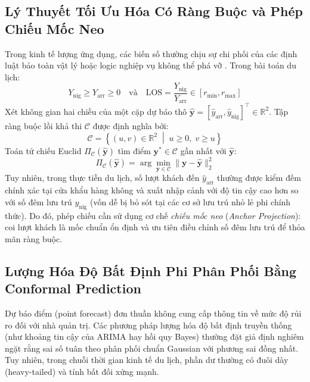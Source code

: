 \subsection{Lý Thuyết Tối Ưu Hóa Có Ràng Buộc và Phép Chiếu Mốc Neo}
Trong kinh tế lượng ứng dụng, các biến số thường chịu sự chi phối của các định luật bảo toàn vật lý hoặc logic nghiệp vụ không thể phá vỡ \cite{cortes2024inconsistency}. Trong bài toán du lịch:
\begin{equation}
    Y_{\text{nig}} \ge Y_{\text{arr}} \ge 0 \quad \text{và} \quad \text{LOS} = \frac{Y_{\text{nig}}}{Y_{\text{arr}}} \in [r_{\min}, r_{\max}]
\end{equation}
Xét không gian hai chiều của một cặp dự báo thô $\hat{\mathbf{y}} = [\hat{y}_{\text{arr}}, \hat{y}_{\text{nig}}]^\top \in \mathbb{R}^2$. Tập ràng buộc lồi khả thi $\mathcal{C}$ được định nghĩa bởi:
\begin{equation}
    \mathcal{C} = \left\{ (u, v) \in \mathbb{R}^2 \;\middle|\; u \ge 0, \; v \ge u \right\}
\end{equation}
Toán tử chiếu Euclid $\Pi_{\mathcal{C}}(\hat{\mathbf{y}})$ tìm điểm $\mathbf{y}^* \in \mathcal{C}$ gần nhất với $\hat{\mathbf{y}}$:
\begin{equation}
    \Pi_{\mathcal{C}}(\hat{\mathbf{y}}) = \arg\min_{\mathbf{y} \in \mathcal{C}} \|\mathbf{y} - \hat{\mathbf{y}}\|_2^2
\end{equation}
Tuy nhiên, trong thực tiễn du lịch, số lượt khách đến $\hat{y}_{\text{arr}}$ thường được kiểm đếm chính xác tại cửa khẩu hàng không và xuất nhập cảnh với độ tin cậy cao hơn so với số đêm lưu trú $\hat{y}_{\text{nig}}$ (vốn dễ bị bỏ sót tại các cơ sở lưu trú nhỏ lẻ phi chính thức). Do đó, phép chiếu cần sử dụng cơ chế \textit{chiếu mốc neo} (\textit{Anchor Projection}): coi lượt khách là mốc chuẩn ổn định và ưu tiên điều chỉnh số đêm lưu trú để thỏa mãn ràng buộc.

\subsection{Lượng Hóa Độ Bất Định Phi Phân Phối Bằng Conformal Prediction}
Dự báo điểm (point forecast) đơn thuần không cung cấp thông tin về mức độ rủi ro đối với nhà quản trị. Các phương pháp lượng hóa độ bất định truyền thống (như khoảng tin cậy của ARIMA hay hồi quy Bayes) thường đặt giả định nghiêm ngặt rằng sai số tuân theo phân phối chuẩn Gaussian với phương sai đồng nhất. Tuy nhiên, trong chuỗi thời gian kinh tế du lịch, phần dư thường có đuôi dày (heavy-tailed) và tính bất đối xứng mạnh.

